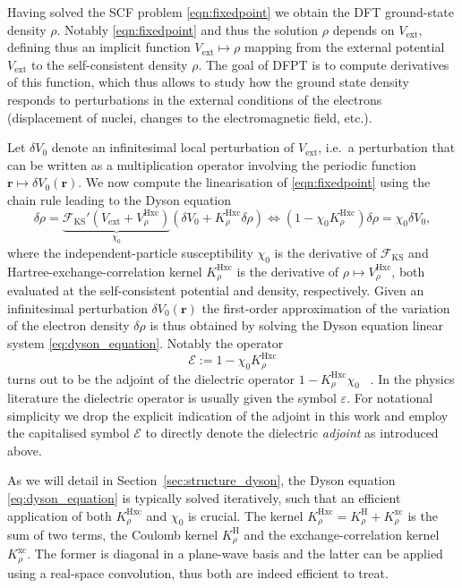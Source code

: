 \documentclass[hidelinks,onefignum,onetabnum]{siamart250211}
\renewcommand{\vec}{\bm}
\newcommand{\Vext}{V_{\mathrm{ext}}} %
\newcommand{\VHxc}{V^{\text{Hxc}}} %
\newcommand{\FKS}{\mathcal{F}_{\mathrm{KS}}}
\newcommand{\KHxc}{K^{\mathrm{Hxc}}}
\begin{document}
Having solved the SCF problem \eqref{eqn:fixedpoint}
we obtain the DFT ground-state density $\rho$.
Notably \eqref{eqn:fixedpoint} and thus the solution $\rho$ depends on $\Vext$,
defining thus an implicit function $\Vext \mapsto \rho$
mapping from the external potential $\Vext$ to the self-consistent density $\rho$.
The goal of DFPT is to compute derivatives of this function,
which thus allows to study how the ground state density responds to perturbations
in the external conditions of the electrons
(displacement of nuclei, changes to the electromagnetic field, etc.).

%
%
%
%
%
%
%
%
%
%
%
%
%
%
%
%
%
%
%
%
%
%
%
%
%
%
%
%
Let $\delta V_0$ denote an infinitesimal local perturbation of $\Vext$,
i.e.~a perturbation that can be written as a multiplication operator
involving the periodic function $\vec{r} \mapsto \delta V_0(\vec{r})$.
We now compute the linearisation of \eqref{eqn:fixedpoint} using the chain rule
leading to the Dyson equation
\begin{equation}\label{eq:dyson_equation}
    \delta \rho = \underbrace{\FKS'(\Vext + \VHxc_\rho)}_{\chi_0}
        \left( \delta V_0 + \KHxc_\rho \delta \rho \right)
    \iff \left( 1 - \chi_0 \KHxc_\rho \right) \delta \rho = \chi_0 \delta V_0,
\end{equation}
where the independent-particle susceptibility $\chi_0$ is the derivative of $\FKS$
and Hartree-exchange-correlation kernel $\KHxc_\rho$ is the derivative
of $\rho \mapsto \VHxc_\rho$,
both evaluated at the self-consistent potential and density, respectively.
Given an infinitesimal perturbation $\delta V_0(\bm{r})$
the first-order approximation of the variation of the electron density $\delta \rho$
is thus obtained by solving the Dyson equation linear system \eqref{eq:dyson_equation}.
Notably the operator
\begin{equation}
    \mathcal{E} := 1 - \chi_0 \KHxc_\rho
\end{equation}
turns out to be the adjoint of the dielectric operator $1 - \KHxc_\rho \chi_0$%
~\cite{adler1962quantum,herbstBlackboxInhomogeneousPreconditioning2020}.
In the physics literature the dielectric operator is usually
given the symbol $\varepsilon$.
For notational simplicity we drop the explicit indication of the adjoint
in this work and employ the capitalised symbol
$\mathcal{E}$ to directly denote the dielectric \textit{adjoint}
as introduced above.

As we will detail in Section~\ref{sec:structure_dyson},
the Dyson equation \eqref{eq:dyson_equation} is typically solved iteratively,
such that an efficient application of both $\KHxc_\rho$ and $\chi_0$ is crucial.
The kernel $\KHxc_\rho = K^\text{H}_\rho + K^\text{xc}_\rho$
is the sum of two terms, the Coulomb kernel $K^\text{H}_\rho$
and the exchange-correlation kernel $K^\text{xc}_\rho$.
The former is diagonal in a plane-wave basis and the latter
can be applied using a real-space convolution, thus both are indeed efficient to treat.
\end{document}
